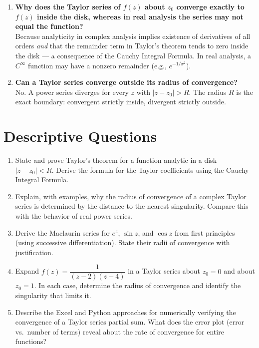\documentclass[12pt,a4paper]{article}
\begin{document}
\begin{enumerate}[label=\textbf{Q\arabic*.}, leftmargin=*, noitemsep]
\item \textbf{Why does the Taylor series of $f(z)$ about $z_0$ converge exactly to $f(z)$ inside the disk, whereas in real analysis the series may not equal the function?}\\
Because analyticity in complex analysis implies existence of derivatives of all orders \emph{and} that the remainder term in Taylor's theorem tends to zero inside the disk --- a consequence of the Cauchy Integral Formula. In real analysis, a $C^\infty$ function may have a nonzero remainder (e.g., $e^{-1/x^2}$).

\item \textbf{Can a Taylor series converge outside its radius of convergence?}\\
No. A power series diverges for every $z$ with $|z-z_0|>R$. The radius $R$ is the exact boundary: convergent strictly inside, divergent strictly outside.

\end{enumerate}

\section{Descriptive Questions}

\begin{enumerate}[label=\textbf{D\arabic*.}, leftmargin=*, noitemsep]

\item State and prove Taylor's theorem for a function analytic in a disk $|z-z_0|<R$. Derive the formula for the Taylor coefficients using the Cauchy Integral Formula.

\item Explain, with examples, why the radius of convergence of a complex Taylor series is determined by the distance to the nearest singularity. Compare this with the behavior of real power series.

\item Derive the Maclaurin series for $e^z$, $\sin z$, and $\cos z$ from first principles (using successive differentiation). State their radii of convergence with justification.

\item Expand $f(z) = \dfrac{1}{(z-2)(z-4)}$ in a Taylor series about $z_0 = 0$ and about $z_0 = 1$. In each case, determine the radius of convergence and identify the singularity that limits it.

\item Describe the Excel and Python approaches for numerically verifying the convergence of a Taylor series partial sum. What does the error plot (error vs.\ number of terms) reveal about the rate of convergence for entire functions?

\end{enumerate}
\end{document}
